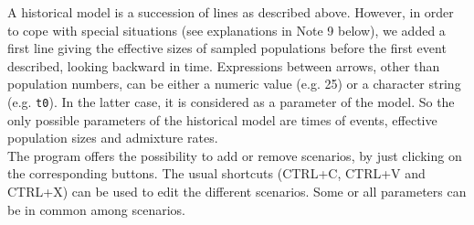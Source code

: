A historical model is a succession of lines as described above. However, in
order to cope with special situations (see explanations in Note
 9 below), we added a first line giving the effective sizes of sampled
populations before the first event described, looking backward in time.
Expressions between arrows, other than population numbers, can be
either a numeric value (e.g. 25) or a character string (e.g.
\texttt{t0}). In the latter case, it is considered as a parameter of
the model. So the only possible parameters of the historical model
are times of events, effective population sizes and admixture
rates.\\
The program offers the possibility to add or remove scenarios, by just clicking on the corresponding buttons. The usual shortcuts (CTRL+C, CTRL+V and CTRL+X) can be used to edit the different scenarios. Some or all parameters can be in common among scenarios.\\

